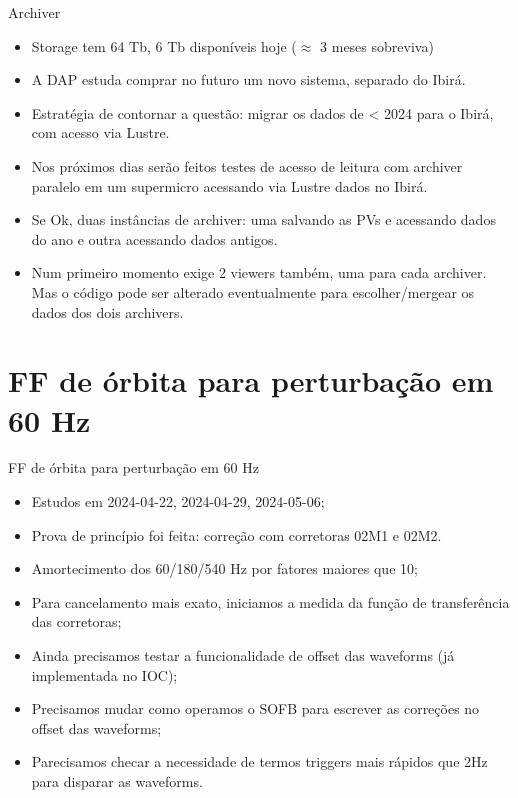 \documentclass[aspectratio=169]{beamer}            %
\begin{document}
\begin{frame}{Archiver}

{\footnotesize 
\begin{itemize}
    \setlength\itemsep{1em}
    \item Storage tem 64 Tb, 6 Tb disponíveis hoje ($\approx$ 3 meses sobreviva)
    \item A DAP estuda comprar no futuro um novo sistema, separado do Ibirá.
    \item Estratégia de contornar a questão: migrar os dados de < 2024 para o Ibirá, com acesso via Lustre.
    \item Nos próximos dias serão feitos testes de acesso de leitura com archiver paralelo em um supermicro acessando via Lustre dados no Ibirá.
    \item Se Ok, duas instâncias de archiver: uma salvando as PVs e acessando dados do ano e outra acessando dados antigos.
    \item Num primeiro momento exige 2 viewers também, uma para cada archiver. Mas o código pode ser alterado eventualmente para escolher/mergear os dados dos dois archivers.
\end{itemize}
}

\end{frame}



\section{FF de órbita para perturbação em 60 Hz}

\begin{frame}{FF de órbita para perturbação em 60 Hz}

\begin{itemize}
    \setlength\itemsep{1em}
    \item Estudos em 2024-04-22, 2024-04-29, 2024-05-06;
    \item Prova de princípio foi feita: correção com corretoras 02M1 e 02M2.
    \item Amortecimento dos 60/180/540 Hz por fatores maiores que 10;
    \item Para cancelamento mais exato, iniciamos a medida da função de transferência das corretoras;
    \item Ainda precisamos testar a funcionalidade de offset das waveforms (já implementada no IOC);
    \item Precisamos mudar como operamos o SOFB para escrever as correções no offset das waveforms;
    \item Parecisamos checar a necessidade de termos triggers mais rápidos que 2Hz para disparar as waveforms.
\end{itemize}

\end{frame}
\end{document}
